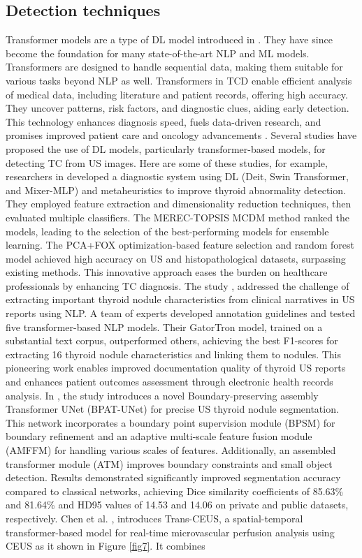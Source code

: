 \documentclass[a4paper,fleqn]{cas-sc}
\begin{document}
\subsection{Detection techniques}
Transformer models are a type of \ac{DL} model introduced in \cite{vaswani2017attention}. They have since become the foundation for many state-of-the-art \ac{NLP} and \ac{ML} models. Transformers are designed to handle sequential data, making them suitable for various tasks beyond NLP as well. Transformers in \ac{TCD} enable efficient analysis of medical data, including literature and patient records, offering high accuracy. They uncover patterns, risk factors, and diagnostic clues, aiding early detection. This technology enhances diagnosis speed, fuels data-driven research, and promises improved patient care and oncology advancements \cite{tran2023video, chi2023hybrid}. Several studies have proposed the use of \ac{DL} models, particularly transformer-based models, for detecting \ac{TC} from \ac{US} images. Here are some of these studies, for example, researchers in \cite{sharma2023framework} developed a diagnostic system using \ac{DL} (Deit, Swin Transformer, and Mixer-MLP) and metaheuristics to improve thyroid abnormality detection. They employed feature extraction and dimensionality reduction techniques, then evaluated multiple classifiers. The MEREC-TOPSIS MCDM method ranked the models, leading to the selection of the best-performing models for ensemble learning. The PCA+FOX optimization-based feature selection and random forest model achieved high accuracy on \ac{US} and histopathological datasets, surpassing existing methods. This innovative approach eases the burden on healthcare professionals by enhancing TC diagnosis. The study \cite{pathak2023extracting}, addressed the challenge of extracting important thyroid nodule characteristics from clinical narratives in \ac{US} reports using \ac{NLP}. A team of experts developed annotation guidelines and tested five transformer-based NLP models. Their GatorTron model, trained on a substantial text corpus, outperformed others, achieving the best F1-scores for extracting 16 thyroid nodule characteristics and linking them to nodules. This pioneering work enables improved documentation quality of thyroid \ac{US} reports and enhances patient outcomes assessment through electronic health records analysis. In \cite{bi2023bpat}, the study introduces a novel Boundary-preserving assembly Transformer UNet (BPAT-UNet) for precise \ac{US} thyroid nodule segmentation. This network incorporates a boundary point supervision module (BPSM) for boundary refinement and an adaptive multi-scale feature fusion module (AMFFM) for handling various scales of features. Additionally, an assembled transformer module (ATM) improves boundary constraints and small object detection. Results demonstrated significantly improved segmentation accuracy compared to classical networks, achieving Dice similarity coefficients of 85.63\% and 81.64\% and HD95 values of 14.53 and 14.06 on private and public datasets, respectively. Chen et al. \cite{chen2023joint}, introduces Trans-CEUS, a spatial-temporal transformer-based model for real-time microvascular perfusion analysis using CEUS as it shown in Figure \ref{fig7}. It combines 
\end{document}

